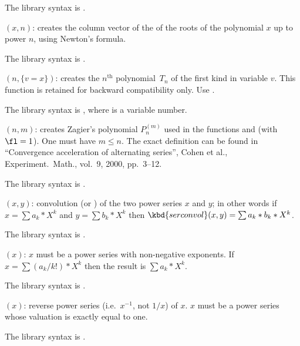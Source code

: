 The library syntax is .

$(x,n)$: \label{se:polsym}creates the column vector of the  of the roots of the
polynomial $x$ up to power $n$, using Newton's formula.

The library syntax is .

$(n,\{v=x\})$: \label{se:poltchebi}creates the $n^{\text{th}}$  polynomial~$T_n$ of the
first kind in variable $v$. This function is retained for backward
compatibility only. Use .

The library syntax is , where  is a variable number.

$(n,m)$: \label{se:polzagier}creates Zagier's polynomial $P_n^{(m)}$ used in
the functions  and  (with $\fl=1$). One must have $m\le
n$. The exact definition can be found in ``Convergence acceleration of
alternating series'', Cohen et al., Experiment.~Math., vol.~9, 2000, pp.~3--12.


The library syntax is .

$(x,y)$: \label{se:serconvol}convolution (or ) of the
two power series $x$ and $y$; in other words if $x=\sum a_k*X^k$ and $y=\sum
b_k*X^k$ then $\kbd{serconvol}(x,y)=\sum a_k*b_k*X^k$.

The library syntax is .

$(x)$: \label{se:serlaplace}$x$ must be a power series with non-negative
exponents. If $x=\sum (a_k/k!)*X^k$ then the result is $\sum a_k*X^k$.

The library syntax is .

$(x)$: \label{se:serreverse}reverse power series (i.e.~$x^{-1}$, not $1/x$)
of $x$. $x$ must be a power series whose valuation is exactly equal to one.

The library syntax is .

